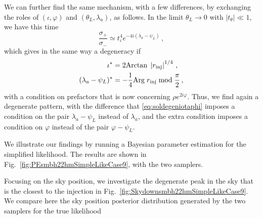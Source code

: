 \documentclass[aps,showpacs,twocolumn,prd,superscriptaddress,nofootinbib]{revtex4-1}
\newcommand{\be}{\begin{equation}}
\newcommand{\ee}{\end{equation}}
\newcommand{\bsub}{\begin{subequations}}
\newcommand{\esub}{\end{subequations}}
\newcommand\calL{{\mathcal{L}}}
\newcommand\betaL{{\beta_{L}}}
\newcommand\lambdaL{{\lambda_{L}}}
\newcommand\varphiL{{\varphi_{L}}}
\newcommand\psiL{{\psi_{L}}}
\newcommand{\SM}[1]{{\color{Blue} #1}}
\begin{document}
We can further find the same mechanism, with a few differences, by exchanging the roles of $(\iota, \varphi)$ and $(\theta_{L}, \lambda_{a})$, as follows. In the limit $\theta_{L} \rightarrow 0$ with $|t_{\theta}| \ll 1$, we have this time
\be
	\frac{\sigma_{+}}{\sigma_{-}} \simeq t_{\iota}^{4} e^{-4i(\lambda_{a} - \psi_{L})} \,,
\ee
which gives in the same way a degeneracy if
\bsub\label{eq:soldegeniotaphi}
\begin{align}
	\iota^{*} &= 2 \mathrm{Arctan} \; \left| r_{\rm inj}\right|^{1/4} \,, \\
	(\lambda_{a} - \psiL)^{*} &= -\frac{1}{4} \mathrm{Arg} \; r_{\rm inj} \;\mathrm{mod}\; \frac{\pi}{2} \,,
\end{align}
\esub
with a condition on prefactors that is now concerning $\rho e^{2 i \varphi}$. Thus, we find again a degenerate pattern, with the difference that \eqref{eq:soldegeniotaphi} imposes a condition on the pair $\lambda_{a} - \psiL$ instead of $\lambda_{a}$, and the extra condition imposes a condition on $\varphi$ instead of the pair $\varphi - \psiL$.

We illustrate our findings by running a Bayesian parameter estimation for the simplified likelihood. The results are shown in Fig.~\ref{fig:PEsmbh22hmSimpleLikeCase9}, with the two samplers.

Focusing on the sky position, we investigate the degenerate peak in the sky that is the closest to the injection in Fig.~\ref{fig:Skydownsmbh22hmSimpleLikeCase9}. We compare here the sky position posterior distribution generated by the two samplers for the true likelihood 

%
\end{document}
